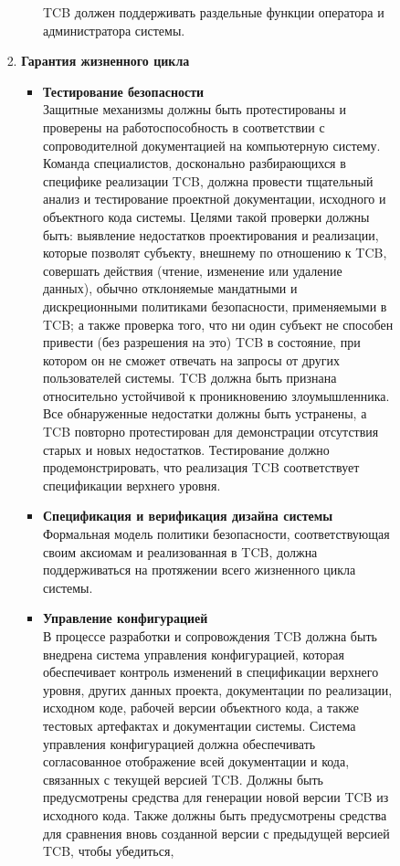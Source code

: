 \begin{enumerate}
\begin{enumerate}
\begin{enumerate}
\begin{enumerate}
\begin{itemize}
					TCB должен поддерживать раздельные функции оператора и администратора системы. 
				\end{itemize}
				\item{\textbf{Гарантия жизненного цикла}}
				\begin{itemize}
					\item{\textbf{Тестирование безопасности}}\\
					Защитные механизмы должны быть протестированы и проверены на работоспособность в соответствии с сопроводителной документацией на компьютерную систему.  Команда специалистов,
					досконально разбирающихся в специфике реализации TCB, должна провести тщательный анализ и тестирование проектной документации, исходного и объектного кода системы. Целями такой
					проверки должны быть: выявление недостатков проектирования и реализации, которые позволят субъекту, внешнему по отношению к TCB, совершать действия (чтение, изменение или удаление данных),
					обычно отклоняемые мандатными и дискреционными политиками безопасности, применяемыми в TCB; а также проверка того, что ни один субъект не способен привести (без разрешения на это)
					TCB в состояние, при котором он не сможет отвечать на запросы от других пользователей системы. TCB должна быть признана относительно устойчивой к проникновению злоумышленника. 
					Все обнаруженные недостатки должны быть устранены, а TCB повторно протестирован для демонстрации отсутствия старых и новых недостатков. Тестирование должно продемонстрировать,
					что реализация TCB соответствует спецификации верхнего уровня.
					\item{\textbf{Спецификация и верификация дизайна системы}}\\
					Формальная модель политики безопасности, соответствующая своим аксиомам и реализованная в TCB, должна поддерживаться на протяжении всего жизненного цикла системы. 
					\item{\textbf{Управление конфигурацией}}\\
					В процессе разработки и сопровождения TCB должна быть внедрена система управления конфигурацией, которая обеспечивает контроль изменений в спецификации верхнего уровня, 
					других данных проекта, документации по реализации, исходном коде, рабочей версии объектного кода, а также тестовых артефактах и документации системы. Система управления 
					конфигурацией должна обеспечивать согласованное отображение всей документации и кода, связанных с текущей версией TCB. Должны быть предусмотрены средства для 
					генерации новой версии TCB из исходного кода. Также должны быть предусмотрены средства для сравнения вновь созданной версии с предыдущей версией TCB, чтобы убедиться, 

\end{itemize}
\end{enumerate}
\end{enumerate}
\end{enumerate}
\end{enumerate}
